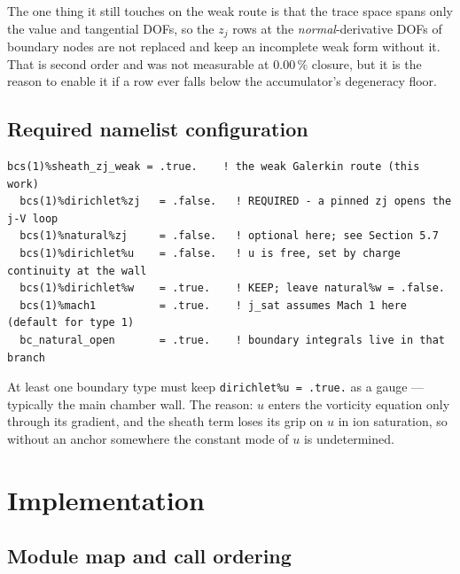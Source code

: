 \documentclass[11pt,a4paper]{article}
\newcommand{\zj}{z_j}
\newcommand{\code}[1]{\texttt{\small #1}}
\begin{document}
The one thing it still touches on the weak route is that the trace space spans only the value and
tangential DOFs, so the $\zj$ rows at the \emph{normal}-derivative DOFs of boundary nodes are not
replaced and keep an incomplete weak form without it. That is second order and was not measurable at
$0.00\,\%$ closure, but it is the reason to enable it if a row ever falls below the accumulator's
degeneracy floor.

\subsection{Required namelist configuration}

\begin{lstlisting}[caption={Enabling the weak sheath condition on the strike-point boundary types.}]
  bcs(1)%sheath_zj_weak = .true.    ! the weak Galerkin route (this work)
  bcs(1)%dirichlet%zj   = .false.   ! REQUIRED - a pinned zj opens the j-V loop
  bcs(1)%natural%zj     = .false.   ! optional here; see Section 5.7
  bcs(1)%dirichlet%u    = .false.   ! u is free, set by charge continuity at the wall
  bcs(1)%dirichlet%w    = .true.    ! KEEP; leave natural%w = .false.
  bcs(1)%mach1          = .true.    ! j_sat assumes Mach 1 here (default for type 1)
  bc_natural_open       = .true.    ! boundary integrals live in that branch
\end{lstlisting}

At least one boundary type must keep \code{dirichlet\%u = .true.} as a gauge --- typically the main
chamber wall. The reason: $u$ enters the vorticity equation only through its gradient, and the sheath
term loses its grip on $u$ in ion saturation, so without an anchor somewhere the constant mode of $u$
is undetermined.

\section{Implementation}

\subsection{Module map and call ordering}
\end{document}
